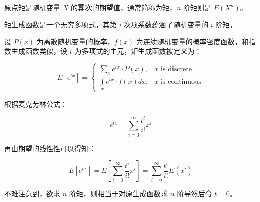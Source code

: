 原点矩是随机变量 $X$ 的幂次的期望值，通常简称为矩，$n$ 阶矩则是 $E(X^n)$。

矩生成函数是一个无穷多项式，其第 $i$ 次项系数蕴涵了随机变量的 $i$ 阶矩。

设 $P(x)$ 为离散随机变量的概率，$f(x)$ 为连续随机变量的概率密度函数，和指数生成函数类似，设 $t$ 为多项式的主元，矩生成函数被定义为：

$$E[e^{tx}] = \begin{cases}\sum\limits_{x} e^{tx} \cdot P(x), & x \text{ is discrete}\\ \int\limits_{x}e^{tx} \cdot f(x)dx, & x \text{ is continuous}\end{cases}$$

根据麦克劳林公式：

$$e^{tx} = \sum_{i = 0}^{\infty}\dfrac{t^i}{i!}x^i$$

再由期望的线性性可以得知：

$$E[e^{tx}] = E\left[\sum_{i = 0}^{\infty}\dfrac{t^i}{i!}x^i\right] = \sum_{i = 0}^{\infty}\dfrac{t^i}{i!}E\left(x^i\right)$$

不难注意到，欲求 $n$ 阶矩，则相当于对原生成函数求 $n$ 阶导然后令 $t = 0$。